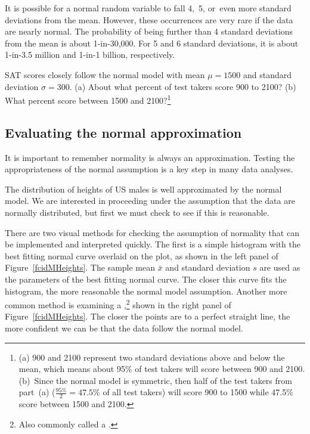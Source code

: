 It is possible for a normal random variable to fall 4,~5, or~even more standard deviations from the mean. However, these occurrences are very rare if the data are nearly normal. The probability of being further than 4 standard deviations from the mean is about 1-in-30,000. For 5 and 6 standard deviations, it is about 1-in-3.5 million and 1-in-1 billion, respectively.

\begin{exercise}
SAT scores closely follow the normal model with mean $\mu = 1500$ and standard deviation $\sigma = 300$. (a) About what percent of test takers score 900 to 2100? (b) What percent score between 1500 and 2100?\footnote{(a) 900 and 2100 represent two standard deviations above and below the mean, which means about 95\% of test takers will score between 900 and 2100. (b)~Since the normal model is symmetric, then half of the test takers from part~(a) ($\frac{95\%}{2} = 47.5\%$ of all test takers) will score 900 to 1500 while 47.5\% score between 1500 and 2100.}
\end{exercise}


\subsection{Evaluating the normal approximation}
\label{assessingNormal}

It is important to remember normality is always an approximation. Testing the appropriateness of the normal assumption is a key step in many data analyses.


The distribution of heights of US males is well approximated by the normal model. We are interested in proceeding under the assumption that the data are normally distributed, but first we must check to see if this is reasonable.

There are two visual methods for checking the assumption of normality that can be implemented and interpreted quickly. The first is a simple histogram with the best fitting normal curve overlaid on the plot, as shown in the left panel of Figure~\ref{fcidMHeights}. The sample mean $\bar{x}$ and standard deviation $s$ are used as the parameters of the best fitting normal curve. The closer this curve fits the histogram, the more reasonable the normal model assumption. Another more common method is examining a ,\footnote{Also commonly called a .} shown in the right panel of Figure~\ref{fcidMHeights}. The closer the points are to a perfect straight line, the more confident we can be that the data follow the normal model.

